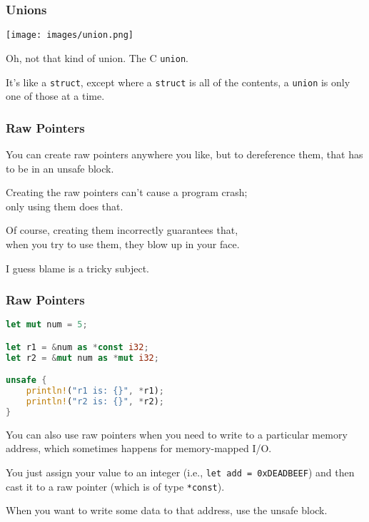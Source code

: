 
\begin{frame}
\frametitle{Unions}
\begin{center}
	\texttt{[image: images/union.png]}
\end{center}

Oh, not that kind of union. The C \texttt{union}.

It's like a \texttt{struct}, except where a \texttt{struct} is all of the contents, a \texttt{union} is only one of those at a time.

\end{frame}


\begin{frame}
\frametitle{Raw Pointers}

You can create raw pointers anywhere you like, but to dereference them, that has to be in an unsafe block. 

Creating the raw pointers can't cause a program crash; \\
\qquad only using them does that.

Of course, creating them incorrectly guarantees that,\\
\qquad when you try to use them, they blow up in your face. 

I guess blame is a tricky subject.

\end{frame}


\begin{frame}[fragile]
\frametitle{Raw Pointers}

\begin{lstlisting}[language=Rust]
let mut num = 5;

let r1 = &num as *const i32;
let r2 = &mut num as *mut i32;

unsafe {
    println!("r1 is: {}", *r1);
    println!("r2 is: {}", *r2);
}
\end{lstlisting}

You can also use raw pointers when you need to write to a particular memory address, which sometimes happens for memory-mapped I/O. 

You just assign your value to an integer (i.e., \texttt{let add = 0xDEADBEEF}) and then cast it to a raw pointer (which is of type \texttt{*const}). 

When you want to write some data to that address, use the unsafe block.

\end{frame}


